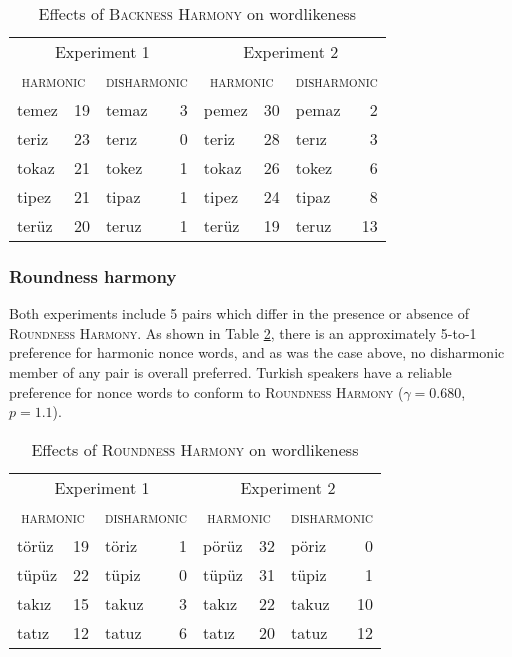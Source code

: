 \begin{table}
\centering
\begin{tabular}{lrlr|lrlr}
\toprule
\multicolumn{4}{c|}{Experiment 1} & \multicolumn{4}{c}{Experiment 2} \\
\multicolumn{2}{c}{\textsc{harmonic}} & \multicolumn{2}{c|}{\textsc{disharmonic}} & \multicolumn{2}{c}{\textsc{harmonic}} & \multicolumn{2}{c}{\textsc{disharmonic}} \\
\midrule
{temez} & 19            & {temaz} & 3 & {pemez} & 30            & {pemaz} & 2 \\
{teriz} & 23            & {terız} & 0 & {teriz} & 28            & {terız} & 3 \\
{tokaz} & 21            & {tokez} & 1 & {tokaz} & 26            & {tokez} & 6 \\
{tipez} & 21            & {tipaz} & 1 & {tipez} & 24            & {tipaz} & 8 \\
{terüz} & 20            & {teruz} & 1 & {terüz} & 19            & {teruz} & 13 \\
\bottomrule
\end{tabular}
\caption{Effects of \textsc{Backness Harmony} on wordlikeness \citep[from][]{Zimmer1969}}
\label{bhw}
\end{table}

\subsubsection{Roundness harmony}

Both experiments include 5 pairs which differ in the presence or absence of \textsc{Roundness Harmony}. As shown in Table \ref{rhw}, there is an approximately 5-to-1 preference for harmonic nonce words, and as was the case above, no disharmonic member of any pair is overall preferred. Turkish speakers have a reliable preference for nonce words to conform to \textsc{Roundness Harmony} ($\gamma = 0.680$, $p = 1.1$).

\begin{table}
\center
\begin{tabular}{lrlr|lrlr}
\toprule
\multicolumn{4}{c|}{Experiment 1} & \multicolumn{4}{c}{Experiment 2} \\
\multicolumn{2}{c}{\textsc{harmonic}} & \multicolumn{2}{c|}{\textsc{disharmonic}} & \multicolumn{2}{c}{\textsc{harmonic}} & \multicolumn{2}{c}{\textsc{disharmonic}} \\
\midrule
{törüz} & 19 & {töriz} & 1 & {pörüz} & 32 & {pöriz} & 0  \\
{tüpüz} & 22 & {tüpiz} & 0 & {tüpüz} & 31 & {tüpiz} & 1  \\
{takız} & 15 & {takuz} & 3 & {takız} & 22 & {takuz} & 10 \\
{tatız} & 12 & {tatuz} & 6 & {tatız} & 20 & {tatuz} & 12 \\
\bottomrule
\end{tabular}
\caption{Effects of \textsc{Roundness Harmony} on wordlikeness \citep[from][]{Zimmer1969}}
\label{rhw}
\end{table}

